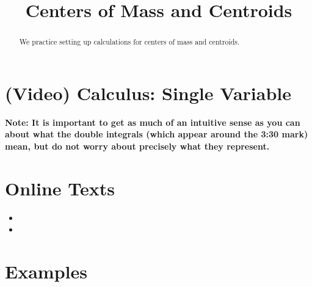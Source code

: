 \documentclass{ximera}
\title{Centers of Mass and Centroids}
\begin{document}
\begin{abstract}
We practice setting up calculations for centers of mass and centroids.
\end{abstract}
\maketitle

\section*{(Video) Calculus: Single Variable}
\textbf{Note: It is important to get as much of an intuitive sense as you can about what the double integrals (which appear around the 3:30 mark) mean, but do not worry about precisely what they represent.}

\section*{Online Texts}
\begin{itemize}
\item {}
\item {}
\end{itemize}

\section*{Examples}
\end{document}
